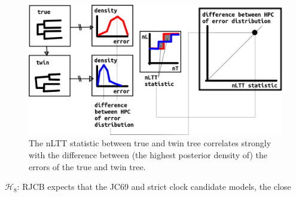 \begin{figure}[!htbp]
  \includegraphics[width=\textwidth]{20191126_nltt_as_proxy.png}
  \caption{
    The nLTT statistic between true and twin tree correlates strongly
    with the difference between (the highest posterior density
    of) the errors of the true and twin tree.
  }
  \label{fig:nltt_as_proxy}
\end{figure}

$\mathcal{H}_8$: RJCB expects that the JC69 and strict clock 
candidate models, the close

